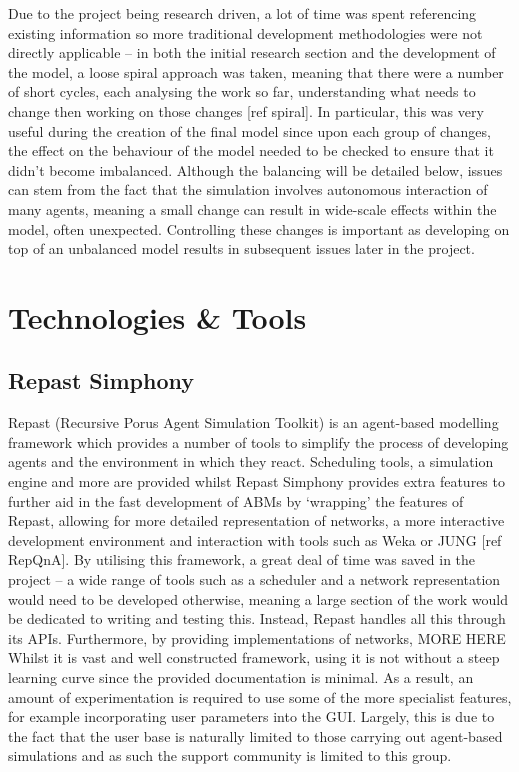 \documentclass[]{report}
\begin{document}
Due to the project being research driven, a lot of time was spent referencing existing information so more traditional development methodologies were not directly applicable – in both the initial research section and the development of the model, a loose spiral approach was taken, meaning that there were a number of short cycles, each analysing the work so far, understanding what needs to change then working on those changes [ref spiral]. In particular, this was very useful during the creation of the final model since upon each group of changes, the effect on the behaviour of the model needed to be checked to ensure that it didn't become imbalanced. Although the balancing will be detailed below, issues can stem from the fact that the simulation involves autonomous interaction of many agents, meaning a small change can result in wide-scale effects within the model, often unexpected. Controlling these changes is important as developing on top of an unbalanced model results in subsequent issues later in the project. 

\section{Technologies \& Tools}
\subsection{Repast Simphony}
Repast (Recursive Porus Agent Simulation Toolkit)  is an agent-based modelling framework which provides a number of tools to simplify the process of developing agents and the environment in which they react. Scheduling tools, a simulation engine and more are provided whilst Repast Simphony provides extra features to further aid in the fast development of ABMs by `wrapping' the features of Repast, allowing for more detailed representation of networks, a more interactive development environment and interaction with tools such as Weka or JUNG [ref RepQnA].
By utilising this framework, a great deal of time was saved in the project – a wide range of tools such as a scheduler and a network representation would need to be developed otherwise, meaning a large section of the work would be dedicated to writing and testing this. Instead, Repast handles all this through its APIs. Furthermore, by providing implementations of networks, 
MORE HERE
Whilst it is vast and well constructed framework, using it is not without a steep learning curve since the provided documentation is minimal. As a result, an amount of experimentation is required to use some of the more specialist features, for example incorporating user parameters into the GUI. Largely, this is due to the fact that the user base is naturally limited to those carrying out agent-based simulations and as such the support community is limited to this group. 
\end{document}
